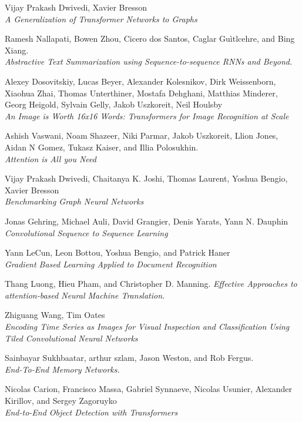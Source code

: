 \documentclass[11pt]{article}
\begin{document}
\begin{thebibliography}{9}

Vijay Prakash Dwivedi, Xavier Bresson \\
\textit{A Generalization of Transformer Networks to Graphs}

Ramesh Nallapati, Bowen Zhou, Cicero dos Santos, Caglar Guìtlcehre, and Bing Xiang. \\
\textit{Abstractive Text Summarization using Sequence-to-sequence RNNs and Beyond.} 

Alexey Dosovitskiy, Lucas Beyer, Alexander Kolesnikov, Dirk Weissenborn, Xiaohua Zhai, Thomas Unterthiner, Mostafa Dehghani, Matthias Minderer, Georg Heigold, Sylvain Gelly, Jakob Uszkoreit, Neil Houlsby\\
\textit{An Image is Worth 16x16 Words: Transformers for Image Recognition at Scale}

Ashish Vaswani, Noam Shazeer, Niki Parmar, Jakob Uszkoreit, Llion Jones, Aidan N Gomez, Tukasz Kaiser, and Illia Polosukhin.\\
\textit{Attention is All you Need}

Vijay Prakash Dwivedi, Chaitanya K. Joshi, Thomas Laurent, Yoshua Bengio, Xavier Bresson\\
\textit{Benchmarking Graph Neural Networks}

Jonas Gehring, Michael Auli, David Grangier, Denis Yarats, Yann N. Dauphin\\
\textit{Convolutional Sequence to Sequence Learning}

Yann LeCun, Leon Bottou, Yoshua Bengio, and Patrick Haner \\
\textit{Gradient Based Learning Applied to Document Recognition}

Thang Luong, Hieu Pham, and Christopher D. Manning.
\textit{Effective Approaches to attention-based Neural Machine Translation.}

Zhiguang Wang, Tim Oates\\
\textit{Encoding Time Series as Images for Visual Inspection and Classification Using Tiled Convolutional Neural Networks}

Sainbayar Sukhbaatar, arthur szlam, Jason Weston, and Rob Fergus.\\
\textit{End-To-End Memory Networks.}

Nicolas Carion, Francisco Massa, Gabriel Synnaeve, Nicolas Usunier, Alexander Kirillov, and Sergey Zagoruyko\\
\textit{End-to-End Object Detection with Transformers}


\end{thebibliography}
\end{document}

